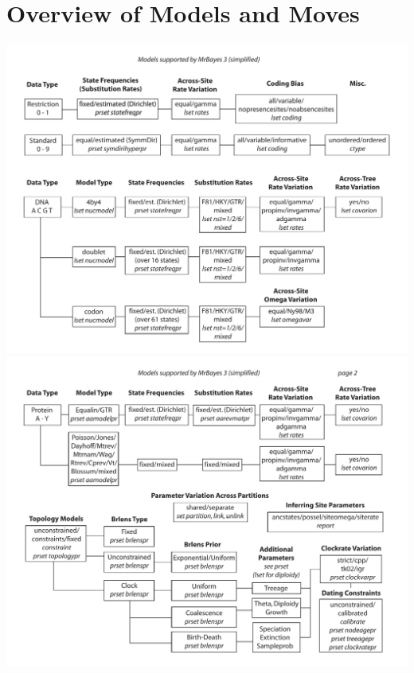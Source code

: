\documentclass[12pt]{book}
\begin{document}
\chapter{Overview of Models and Moves}\label{appendixOverview}
\hspace{-12mm}\includegraphics[width=0.85\textheight]{Appendix_Fig1.pdf}\newpage
\hspace{-8mm}\includegraphics[width=0.85\textheight]{Appendix_Fig2.pdf}
\end{document}
